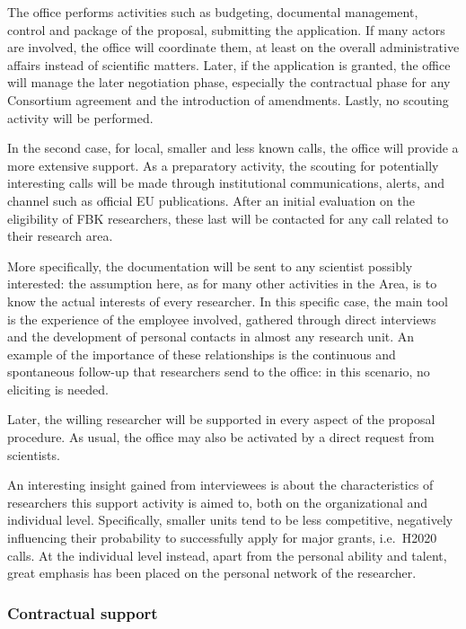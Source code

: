 The office performs activities such as budgeting, documental management, control and package of the proposal, submitting the application. If many actors are involved, the office will coordinate them, at least on the overall administrative affairs instead of scientific matters. Later, if the application is granted, the office will manage the later negotiation phase, especially the contractual phase for any Consortium agreement and the introduction of amendments. Lastly, no scouting activity will be performed. 

In the second case, for local, smaller and less known calls, the office will provide a more extensive support. As a preparatory activity, the scouting for potentially interesting calls will be made through institutional communications, alerts, and channel such as official EU publications. After an initial evaluation on the eligibility of FBK researchers, these last will be contacted for any call related to their research area. 

More specifically, the documentation will be sent to any scientist possibly interested: the assumption here, as for many other activities in the Area, is to know the actual interests of every researcher. In this specific case, the main tool is the experience of the employee involved, gathered through direct interviews and the development of personal contacts in almost any research unit. An example of the importance of these relationships is the continuous and spontaneous follow-up that researchers send to the office: in this scenario, no eliciting is needed.

Later, the willing researcher will be supported in every aspect of the proposal procedure. As usual,  the office may also be activated by a direct request from scientists. 

An interesting insight gained from interviewees is about the characteristics of researchers this support activity is aimed to, both on the organizational and individual level. Specifically, smaller units tend to be less competitive, negatively influencing their probability to successfully apply for major grants, i.e.\ H2020 calls. At the individual level instead, apart from the personal ability and talent, great emphasis has been placed on the personal network of the researcher. 

\subsubsection{Contractual support}

